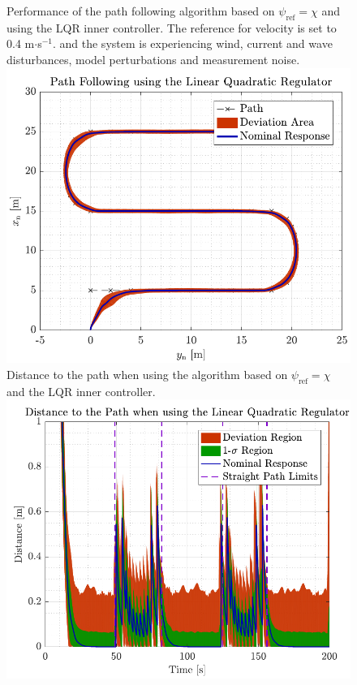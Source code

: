 \begin{figure}[H]
	\captionbox  %
	{  
		Performance of the path following algorithm based on $\psi_\mathrm{ref}=\chi$ and using the LQR inner controller. The reference for velocity is set to \num{0.4} m$\cdot$s$^{-1}$. and the system is experiencing wind, current and wave disturbances, model perturbations and measurement noise. \label{fig:lqrwrong}                                
	}                                                                 
	{                                                                  
		\includegraphics[width=.45\textwidth]{figures/path_lqr_no_correc}         
	}                                                                    
	\hspace{5pt}                                                  
	\captionbox
	{       
		Distance to the path when using the algorithm based on $\psi_\mathrm{ref}=\chi$ and the LQR inner controller.
		\label{fig:distlqrwrong}                               
	}                                                                  
	{                                                                    
		\includegraphics[width=.45\textwidth]{figures/dist_lqr_no_correc}         
	}                                                                         
\end{figure}
